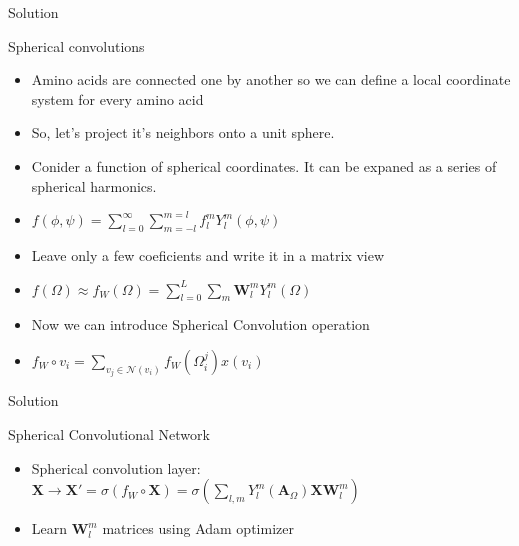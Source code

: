 \documentclass{beamer}
\begin{document}
\begin{frame}{Solution}
    \begin{block}{Spherical convolutions}
        \begin{itemize}
            \item Amino acids are connected one by another so we can define a local coordinate system for every amino acid
            \item So, let's project it's neighbors onto a unit sphere.
            \item Conider a function of spherical coordinates. It can be expaned as a series of spherical harmonics.
            \item $f(\phi, \psi) = \sum_{l = 0}^{\infty} \sum_{m=-l}^{m=l}f_l^m Y_l^m(\phi, \psi)$
            \item Leave only a few coeficients and write it in a matrix view
            \item $f(\Omega) \approx f_W(\Omega) = \sum_{l=0}^{L}\sum_m \boldsymbol{W}_l^m Y_l^m(\Omega)$
            \item Now we can introduce Spherical Convolution operation
            \item $f_W \circ v_i = \sum_{v_j \in \mathcal{N}(v_i)} f_W(\Omega_i^j)x(v_i)$
        \end{itemize}
    \end{block}
\end{frame}
\begin{frame}{Solution}
    \begin{block}{Spherical Convolutional Network}
        \begin{itemize}
            \item Spherical convolution layer: $\boldsymbol{X} \longrightarrow \boldsymbol{X}' = \sigma(f_W \circ \boldsymbol{X}) = \sigma\left(\sum_{l,m}Y_l^m(\boldsymbol{A}_\Omega)\boldsymbol{X}\boldsymbol{W}_l^m\right)$
            \item Learn $\boldsymbol{W}_l^m$ matrices using Adam optimizer
        \end{itemize}
    \end{block}
\end{frame}
\end{document}
